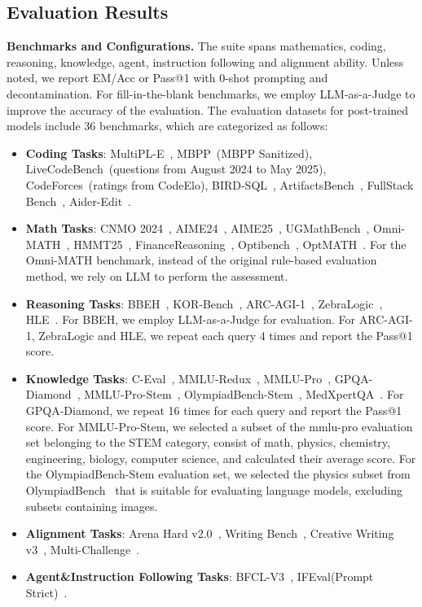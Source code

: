 \documentclass[table]{gtech}
\theoremstyle{definition}
\begin{document}
\subsection{Evaluation Results}

{\bfseries Benchmarks and Configurations.} 
The suite spans mathematics, coding, reasoning, knowledge, agent, instruction following and alignment ability. Unless noted, we report EM/Acc or Pass@1 with 0-shot prompting and decontamination. For fill-in-the-blank benchmarks, we employ LLM-as-a-Judge to improve the accuracy of the evaluation. The evaluation datasets for post-trained models include 36 benchmarks, which are categorized as follows:
\begin{itemize}
    \item \textbf{Coding Tasks}: MultiPL-E~\citep{cassano2022multipl}, MBPP~\citep{austin2021program}(MBPP Sanitized), LiveCodeBench~\citep{livecodebench}(questions from August 2024 to May 2025), CodeForces~\citep{quan2025codeelo}(ratings from CodeElo), BIRD-SQL~\citep{li2023can}, ArtifactsBench~\citep{artifactsbench}, FullStack Bench~\citep{cheng2024fullstack}, Aider-Edit~\citep{aider}. 
    \item \textbf{Math Tasks}: CNMO 2024~\citep{livemathbench}, AIME24~\citep{aime24}, AIME25~\citep{aime25}, UGMathBench~\citep{xu2025ugmathbench}, Omni-MATH~\citep{omni-math}, HMMT25~\citep{HMMT25}, FinanceReasoning~\citep{FinanceReasoning}, Optibench~\citep{optibench}, OptMATH~\citep{optmath}. For the Omni-MATH benchmark, instead of the original rule-based evaluation method, we rely on LLM to perform the assessment.
    \item \textbf{Reasoning Tasks}: BBEH~\citep{bbeh}, KOR-Bench~\citep{korbench}, ARC-AGI-1~\citep{arc-agi}, ZebraLogic~\citep{zebralogic}, HLE~\citep{hle}. For BBEH, we employ LLM-as-a-Judge for evaluation. For ARC-AGI-1, ZebraLogic and HLE, we repeat each query 4 times and report the Pass@1 score. 
    \item \textbf{Knowledge Tasks}: C-Eval~\citep{ceval},  MMLU-Redux~\citep{mmlu}, MMLU-Pro~\citep{mmlu-pro}, GPQA-Diamond~\citep{gpqa}, MMLU-Pro-Stem~\citep{mmlu-pro}, OlympiadBench-Stem~\citep{he2024olympiadbench}, MedXpertQA~\citep{zuomedxpertqa}. For GPQA-Diamond, we repeat 16 times for each query and report the Pass@1 score. For MMLU-Pro-Stem, we selected a subset of the mmlu-pro evaluation set belonging to the STEM category, consist of math, physics, chemistry, engineering, biology, computer science, and calculated their average score. For the OlympiadBench-Stem evaluation set, we selected the physics subset from OlympiadBench~\citep{he2024olympiadbench} that is suitable for evaluating language models, excluding subsets containing images.
    \item \textbf{Alignment Tasks}: Arena Hard v2.0~\citep{li2024crowdsourced,arenahard2024}, Writing Bench~\citep{wu2025writingbench}, Creative Writing v3~\citep{creative-writing-bench-v3}, Multi-Challenge~\citep{deshpande-etal-2025-multichallenge}.
    \item \textbf{Agent\&Instruction Following Tasks}: BFCL-V3~\citep{berkeley-function-calling-leaderboard}, IFEval(Prompt Strict)~\citep{zhou2023instruction}.
\end{itemize}
\end{document}

